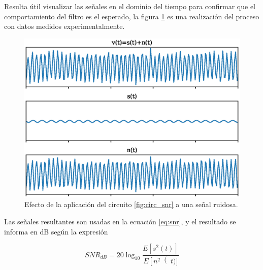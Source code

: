 \documentclass[11pt,a4paper]{extarticle}
\begin{document}
\begin{multicols}{2}
Resulta útil visualizar las señales en el dominio del tiempo para confirmar que el comportamiento del filtro es el esperado, la figura \ref{fig:snr_tiempo} es una realización del proceso con datos medidos experimentalmente.

\begin{figure}[H]
	\centering
	\includegraphics[width=\linewidth]{Images/snr_tiempo.eps}
	\caption{Efecto de la aplicación del circuito \ref{fig:circ_snr} a una señal ruidosa.}
	\label{fig:snr_tiempo}
\end{figure}

Las señales resultantes son usadas en la ecuación \ref{eq:snr}, y el resultado se informa en dB según la expresión

\begin{equation}\label{eq:snr_db}
	SNR_{dB} = 20\log_{10}\frac{E\left[s^2(t)\right]}{E\left[n^2\right(t)]}
\end{equation}

\end{multicols}
\end{document}
